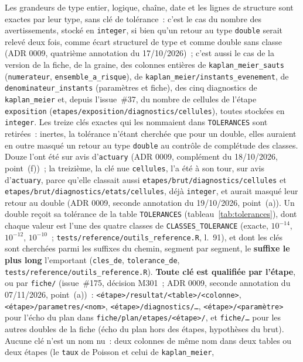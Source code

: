 \documentclass[a4paper,11pt]{article}
\newcommand{\code}[1]{\texttt{\small #1}}
\begin{document}
\noindent
Les grandeurs de type entier, logique, chaîne, date et les lignes de
structure sont exactes par leur type, sans clé de tolérance~: c'est le cas
du nombre des avertissements, stocké en \code{integer}, si bien qu'un retour
au type \code{double} serait relevé deux fois, comme écart structurel de
type et comme double sans classe (ADR 0009, quatrième annotation du
17/10/2026)~; c'est aussi le cas de la version de la fiche, de la graine, des
colonnes entières de \code{kaplan\_meier\_sauts} (\code{numerateur},
\code{ensemble\_a\_risque}), de \code{kaplan\_meier/instants\_evenement}, de
\code{denominateur\_instants} (paramètres et fiche), des cinq diagnostics
de \code{kaplan\_meier} et, depuis l'issue~\#37, du nombre de cellules de
l'étape \code{exposition} (\code{etapes/exposition/diagnostics/cellules}),
toutes stockées en \code{integer}. Les treize clés exactes qui les
nommaient dans \code{TOLERANCES} sont retirées~: inertes, la tolérance
n'étant cherchée que pour un double, elles auraient en outre masqué un
retour au type \code{double} au contrôle de complétude des classes. Douze
l'ont été sur avis d'\code{actuary} (ADR 0009, complément du 18/10/2026,
point~(f))~; la treizième, la clé nue \code{cellules}, l'a été à son tour,
sur avis d'\code{actuary}, parce qu'elle classait aussi
\code{etapes/brut/diagnostics/cellules} et
\code{etapes/brut/diagnostics/etats/cellules}, déjà \code{integer}, et
aurait masqué leur retour au double (ADR 0009, seconde annotation du
19/10/2026, point~(a)). Un double reçoit sa tolérance de la
table \code{TOLERANCES} (tableau~\ref{tab:tolerances}), dont chaque valeur
est l'une des quatre classes de \code{CLASSES\_TOLERANCE} (exacte,
$10^{-14}$, $10^{-12}$, $10^{-10}$~; \code{tests/reference/outils\_reference.R},
l.~91), et dont les clés sont
cherchées parmi les suffixes du chemin, segment par segment, le
\textbf{suffixe le plus long} l'emportant (\code{cles\_de},
\code{tolerance\_de}, \code{tests/reference/outils\_reference.R}).
\textbf{Toute clé est qualifiée par l'étape}, ou par \code{fiche/}
(issue~\#175, décision M301~; ADR 0009, seconde annotation du 07/11/2026,
point~(a))~: \code{<étape>/resultat/<table>/<colonne>},
\code{<étape>/parametres/<nom>}, \code{<étape>/diagnostics/\ldots},
\code{<étape>/<paramètre>} pour l'écho du plan dans
\code{fiche/plan/etapes/<étape>/}, et \code{fiche/\ldots} pour les autres
doubles de la fiche (écho du plan hors des étapes, hypothèses du brut).
Aucune clé n'est un nom nu~: deux colonnes de même nom dans deux tables ou
deux étapes (le \code{taux} de Poisson et celui de \code{kaplan\_meier},
\end{document}
